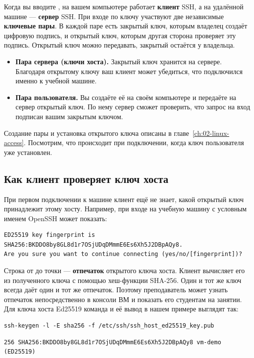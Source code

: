 Когда вы вводите , на вашем компьютере
работает \textbf{клиент} SSH, а на удалённой машине --- \textbf{сервер}
SSH. При входе по ключу участвуют две независимые \textbf{ключевые пары}.
В каждой паре есть закрытый ключ, которым владелец создаёт цифровую
подпись, и открытый ключ, которым другая сторона проверяет эту подпись.
Открытый ключ можно передавать, закрытый остаётся у владельца.

\begin{itemize}
  \item \textbf{Пара сервера (ключи хоста).} Закрытый ключ хранится на
    сервере. Благодаря открытому ключу ваш клиент может убедиться, что
    подключился именно к учебной машине.
  \item \textbf{Пара пользователя.} Вы создаёте её на своём компьютере
    и передаёте на сервер открытый ключ. По нему сервер сможет проверить,
    что запрос на вход подписан вашим закрытым ключом.
\end{itemize}

Создание пары и установка открытого ключа описаны в
главе~\ref{ch:02-linux-access}. Посмотрим, что происходит при
подключении, когда ключ пользователя уже установлен.

\subsection{Как клиент проверяет ключ хоста}

При первом подключении к машине клиент ещё не знает, какой открытый
ключ принадлежит этому хосту. Например, при входе на учебную машину
с условным именем  OpenSSH может показать:

\begin{verbatim}
ED25519 key fingerprint is SHA256:BKDDO8by8GL8d1r7OSjUDqDMmmE6Es6Xh5J2DBpAQy8.
Are you sure you want to continue connecting (yes/no/[fingerprint])?
\end{verbatim}

Строка от  до точки --- \textbf{отпечаток} открытого ключа
хоста. Клиент вычисляет его из полученного ключа с помощью хеш-функции
SHA-256. Один и тот же ключ всегда даёт один и тот же отпечаток.
Поэтому преподаватель может узнать отпечаток непосредственно в консоли
ВМ и показать его студентам на занятии. Для ключа хоста Ed25519 команда
и её вывод в нашем примере выглядят так:

\begin{verbatim}
ssh-keygen -l -E sha256 -f /etc/ssh/ssh_host_ed25519_key.pub
\end{verbatim}
\begin{verbatim}
256 SHA256:BKDDO8by8GL8d1r7OSjUDqDMmmE6Es6Xh5J2DBpAQy8 vm-demo (ED25519)
\end{verbatim}

